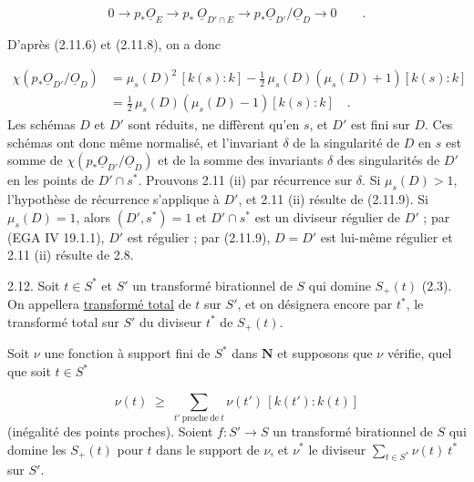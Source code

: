 \begin{equation*}
0 \longrightarrow p_*\underline{O}_E \longrightarrow p_*\ \underline{O}_{D'\cap E} \longrightarrow p_*\underline{O}_{D'}/\underline{O}_D \longrightarrow 0 \qquad .
\end{equation*}


D'après (2.11.6) et (2.11.8), on a donc

\begin{equation}\tag{2.11.9}
\begin{aligned}
\chi(p_*\underline{O}_{D'}/\underline{O}_D) &= \mu_s(D)^2\,[k(s) : k] - \frac{1}{2}\,\mu_s(D)(\mu_s(D)+1)[k(s): k] \\
&= \frac{1}{2}\,\mu_s(D)(\mu_s(D)-1)[k(s) : k] \quad .
\end{aligned}
\end{equation}
Les schémas $D$ et $D'$ sont réduits, ne diffèrent qu'en $s$, et $D'$ est fini sur $D$. Ces schémas ont donc même normalisé, et l'invariant $\delta$ de la singularité de $D$ en $s$ est somme de $\chi(p_*\underline{O}_{D'}/\underline{O}_D)$ et de la somme des invariants $\delta$ des singularités de $D'$ en les points de $D' \cap s^*$. Prouvons 2.11 (ii) par récurrence sur $\delta$. Si $\mu_s(D) > 1$, l'hypothèse de récurrence s'applique à $D'$, et 2.11 (ii) résulte de (2.11.9). Si $\mu_s(D) = 1$, alors $(D',s^*) = 1$ et $D' \cap s^*$ est un diviseur régulier de $D'$ ; par (EGA IV 19.1.1), $D'$ est régulier ; par (2.11.9), $D = D'$ est lui-même régulier et 2.11 (ii) résulte de 2.8.

2.12. Soit $t \in S^*$ et $S'$ un transformé birationnel de $S$ qui domine $S_+(t)$ (2.3). On appellera \underline{transformé total} de $t$ sur $S'$, et on désignera encore par $t^*$, le transformé total sur $S'$ du diviseur $t^*$ de $S_+(t)$.

Soit $\nu$ une fonction à support fini de $S^*$ dans $\mathbf{N}$ et supposons que $\nu$ vérifie, quel que soit $t \in S^*$

\begin{equation}\tag{2.12.1}
\nu(t) \;\geq\; \sum_{t' \ \mathrm{proche\ de}\ t} \nu(t')\,[k(t') : k(t)]
\end{equation}
(inégalité des points proches). Soient $f : S' \longrightarrow S$ un transformé birationnel de $S$ qui domine les $S_+(t)$ pour $t$ dans le support de $\nu$, et $\nu^*$ le diviseur $\sum_{t \in S^*} \nu(t)\ t^*$ sur $S'$.



